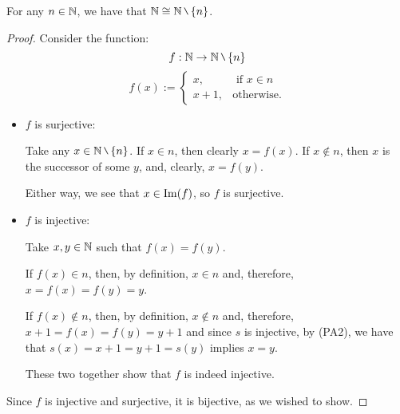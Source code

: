 \begin{lemma}
	For any $n\in\mathbb N$, we have that $\N\iso \N\setminus\{n\}$.
\end{lemma}
\begin{proof}
	Consider the function:
	\[f:\N\to \N\setminus\{n\}\]
	\[f(x):=\begin{cases}
	x,&\mbox{ if }x\in n\\
	x+1,&\mbox{otherwise}.
	\end{cases}\]
	
	\begin{itemize}
		\item $f$ is surjective:
		
		Take any $x\in \N\setminus\{n\}$. If $x\in n$, then clearly $x=f(x)$. If $x\notin n$, then $x$ is the successor of some $y$, and, clearly, $x=f(y)$.
		
		Either way, we see that $x\in\operatorname{Im}(f)$, so $f$ is surjective.
		
		\item $f$ is injective:
		
		Take $x,y\in\mathbb N$ such that $f(x)=f(y)$.
		
		If $f(x)\in n$, then, by definition, $x\in n$ and, therefore, $x=f(x)=f(y)=y$.
		
		If $f(x)\notin n$, then, by definition, $x\notin n$ and, therefore, $x+1=f(x)=f(y)=y+1$ and since $s$ is injective, by (PA2), we have that $s(x)=x+1=y+1=s(y)$ implies $x=y$.
		
		These two together show that $f$ is indeed injective.		
	\end{itemize}

Since $f$ is injective and surjective, it is bijective, as we wished to show.
\end{proof}

